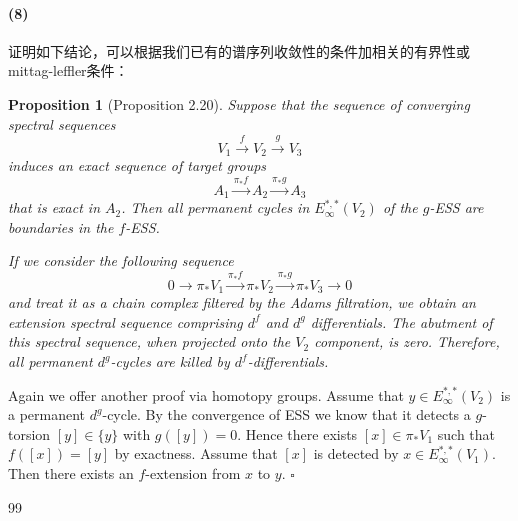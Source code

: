\documentclass[12pt,a4paper]{article}
\renewenvironment{proof}{{\noindent\it\textbf{Proof}}\quad\it}{\hfill$\square$}
\newtheorem{prop}[equation]{Proposition}
\begin{document}
\begin{sloppy}
\paragraph{(8)}证明如下结论，可以根据我们已有的谱序列收敛性的条件加相关的有界性或mittag-leffler条件：

\begin{prop}[Proposition 2.20]
Suppose that the sequence of converging spectral sequences
$$V_1 \xrightarrow{f} V_2 \xrightarrow{g} V_3$$
induces an exact sequence of target groups
$$A_1 \xrightarrow{\pi_*f} A_2 \xrightarrow{\pi_*g} A_3$$
that is exact in $A_2$. Then all permanent cycles in $E_\infty^{*,*}(V_2)$ of the $g$-ESS are boundaries in the $f$-ESS.
\end{prop}
\begin{proof}
If we consider the following sequence
$$0 \to \pi_*V_1 \xrightarrow{\pi_*f} \pi_*V_2 \xrightarrow{\pi_*g} \pi_*V_3 \to 0$$
and treat it as a chain complex filtered by the Adams filtration, we obtain an extension spectral sequence comprising $d^f$ and $d^g$ differentials. The abutment of this spectral sequence, when projected onto the $V_2$ component, is zero. Therefore, all permanent $d^g$-cycles are killed by $d^f$-differentials.

Again we offer another proof via homotopy groups. Assume that $y \in E_\infty^{*,*}(V_2)$ is a permanent $d^g$-cycle. By the convergence of ESS we know that it detects a $g$-torsion $[y] \in \{y\}$ with $g([y]) = 0$. Hence there exists $[x] \in \pi_*V_1$ such that $f([x]) = [y]$ by exactness. Assume that $[x]$ is detected by $x \in E_\infty^{*,*}(V_1)$. Then there exists an $f$-extension from $x$ to $y$.
\end{proof}

\begin{thebibliography}{99}


\end{thebibliography}

\end{sloppy}
\end{document}
